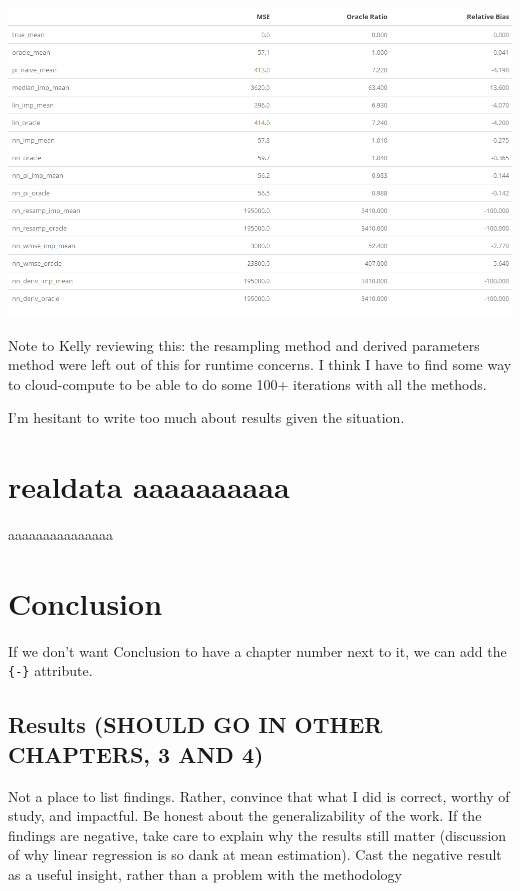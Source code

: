 \documentclass[12pt,twoside]{reedthesis}
\begin{document}
\includegraphics{figure/newresults.png}

Note to Kelly reviewing this: the resampling method and derived
parameters method were left out of this for runtime concerns. I think I
have to find some way to cloud-compute to be able to do some 100+
iterations with all the methods.

I'm hesitant to write too much about results given the situation.

\chapter{realdata aaaaaaaaaa}\label{realdata-aaaaaaaaaa}

aaaaaaaaaaaaaaa

\chapter*{Conclusion}\label{conclusion}

If we don't want Conclusion to have a chapter number next to it, we can
add the \texttt{\{-\}} attribute.

\section{Results (SHOULD GO IN OTHER CHAPTERS, 3 AND
4)}\label{results-should-go-in-other-chapters-3-and-4}

Not a place to list findings. Rather, convince that what I did is
correct, worthy of study, and impactful. Be honest about the
generalizability of the work. If the findings are negative, take care to
explain why the results still matter (discussion of why linear
regression is so dank at mean estimation). Cast the negative result as a
useful insight, rather than a problem with the methodology
\end{document}
